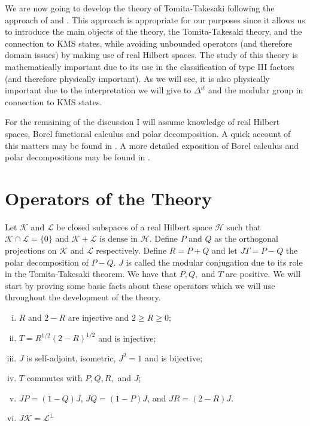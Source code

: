 We are now going to develop the theory of Tomita-Takesaki following the approach of \cite{Duvenhage1999} and \cite{Rieffel1977}. This approach is appropriate for our purposes since it allows us to introduce the main objects of the theory, the Tomita-Takesaki theory, and the connection to KMS states, while avoiding unbounded operators (and therefore domain issues) by making use of real Hilbert spaces. The study of this theory is mathematically important due to its use in the classification of type III factors (and therefore physically important). As we will see, it is also physically important due to the interpretation we will give to $\Delta^{it}$ and the modular group in connection to KMS states.

For the remaining of the discussion I will assume knowledge of real Hilbert spaces, Borel functional calculus and polar decomposition. A quick account of this matters may be found in \cite{Duvenhage1999}. A more detailed exposition of Borel calculus and polar decompositions may be found in \cite{Rudin1991}.

\section{Operators of the Theory}

Let $\mathcal{K}$ and $\mathcal{L}$ be closed subspaces of a real Hilbert space $\mathcal{H}$ such that $\mathcal{K}\cap\mathcal{L}=\{0\}$ and $\mathcal{K}+\mathcal{L}$ is dense in $\mathcal{H}$. Define $P$ and $Q$ as the orthogonal projections on $\mathcal{K}$ and $\mathcal{L}$ respectively. Define $R=P+Q$ and let $JT=P-Q$ the polar decomposition of $P-Q$. $J$ is called the modular conjugation due to its role in the Tomita-Takesaki theorem. We have that $P,Q,$ and $T$ are positive. We will start by proving some basic facts about these operators which we will use throughout the development of the theory.

\begin{theorem}
\begin{enumerate}[(i)]
\item $R$ and $2-R$ are injective and $2\geq R \geq 0$;
\item $T=R^{1/2}(2-R)^{1/2}$ and is injective;
\item $J$ is self-adjoint, isometric, $J^2=1$ and is bijective;
\item $T$ commutes with $P,Q,R,$ and $J$;
\item $JP=(1-Q)J$, $JQ=(1-P)J$, and $JR=(2-R)J$.
\item $J\mathcal{K}=\mathcal{L}^\bot$
\end{enumerate}
\end{theorem}

